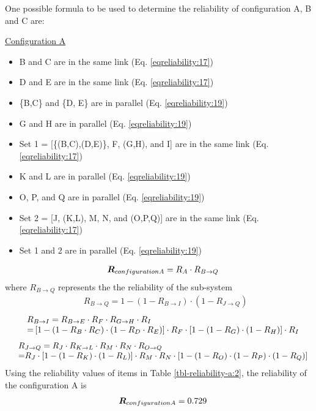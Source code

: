 One possible formula to be used to determine the reliability of configuration A,
B and C are:

\underline{Configuration A} 

\begin{itemize}
	\item B and C are in the same link (Eq. \eqref{eqreliability:17})
	\item D and E are in the same link (Eq. \eqref{eqreliability:17})
	\item \{B,C\} and \{D, E\} are in parallel (Eq. \eqref{eqreliability:19})
	\item G and H are in parallel (Eq. \eqref{eqreliability:19})
	\item Set 1 = [\{(B,C),(D,E)\}, F, (G,H), and I] are in the same link  (Eq. \eqref{eqreliability:17})
	\item K and L are in parallel (Eq. \eqref{eqreliability:19})
	\item O, P, and Q are in parallel (Eq. \eqref{eqreliability:19})
	\item Set 2 = [J, (K,L), M, N, and (O,P,Q)] are in the same link (Eq. \eqref{eqreliability:17})
	\item Set 1 and 2 are in parallel (Eq. \eqref{eqreliability:19})
\end{itemize}
\begin{eqnarray}
&& {\vec R_{configuration{\rm{ }}A}} = {R_A} \cdot {R_{B \to Q}}
\label{eq-reliability-a5}
\end{eqnarray}
where  ${R_{B \to Q}}$ represents the the reliability of the sub-system
%
\begin{eqnarray}
&& {R_{B \to Q}} = 1 - (1 - {R_{B \to I}}) \cdot (1 - {R_{J \to Q}})
\label{eq-reliability-a6}
\end{eqnarray}
%
\begin{eqnarray}
&& \begin{array}{l}
{R_{B \to I}} = {R_{B \to E}} \cdot {R_F} \cdot {R_{G \to H}} \cdot {R_I}\\
{\rm{          = }}\left[ {1 - (1 - {R_B} \cdot {R_C}) \cdot (1 - {R_D} \cdot
{R_E})} \right] \cdot {R_F} \cdot \left[ {1 - (1 - {R_G}) \cdot (1 - {R_H})}
\right] \cdot {R_I}
\end{array}
\label{eq-reliability-a7}
\end{eqnarray}
\begin{eqnarray}
&& \begin{array}{l}
{R_{J \to Q}} = {R_J} \cdot {R_{K \to L}} \cdot {R_M} \cdot {R_N} \cdot {R_{O
\to Q}}\\
{\rm{          = }}{R_J} \cdot \left[ {1 - (1 - {R_K}) \cdot (1 - {R_L})}
\right] \cdot {R_M} \cdot {R_N} \cdot \left[ {1 - (1 - {R_O}) \cdot (1 - {R_P})
\cdot (1 - {R_Q})} \right]
\end{array}
\label{eq-reliability-a8}
\end{eqnarray}
Using the reliability values of items in Table \ref{tbl-reliability-a:2}, the reliability of
the configuration A is
\begin{eqnarray}
&& {\vec R_{configuration{\rm{ }}A}} = 0.729 \nonumber
\end{eqnarray}

